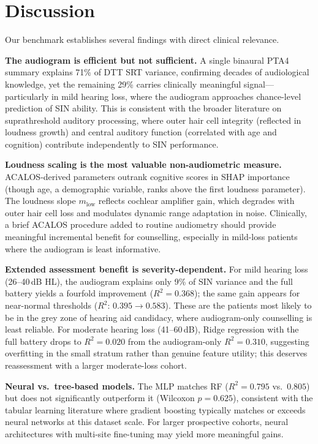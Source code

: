 \documentclass[12pt,a4paper]{article}
\begin{document}
\section{Discussion}

Our benchmark establishes several findings with direct clinical relevance.

\textbf{The audiogram is efficient but not sufficient.}  A single binaural
PTA4 summary explains 71\% of DTT SRT variance, confirming decades of
audiological knowledge\cite{Smoorenburg1992}, yet the remaining 29\%
carries clinically meaningful signal---particularly in mild hearing loss,
where the audiogram approaches chance-level prediction of SIN ability.
This is consistent with the broader literature on suprathreshold auditory
processing, where outer hair cell integrity (reflected in loudness growth)
and central auditory function (correlated with age and cognition) contribute
independently to SIN performance\cite{Moore2001DeadRegions}.

\textbf{Loudness scaling is the most valuable non-audiometric measure.}
ACALOS-derived parameters outrank cognitive scores in SHAP importance (though
age, a demographic variable, ranks above the first loudness parameter).  The
loudness slope $m_\text{low}$ reflects cochlear amplifier gain, which degrades
with outer hair cell loss and modulates dynamic range adaptation in
noise\cite{Brand2002}.  Clinically, a brief ACALOS procedure added
to routine audiometry should provide meaningful incremental benefit for
counselling, especially in mild-loss patients where the audiogram is least
informative.

\textbf{Extended assessment benefit is severity-dependent.}  For mild hearing
loss (26--40\,dB HL), the audiogram explains only 9\% of SIN variance and
the full battery yields a fourfold improvement ($R^2=0.368$); the same gain
appears for near-normal thresholds ($R^2$: $0.395\to0.583$).  These are the
patients most likely to be in the grey zone of hearing aid candidacy, where
audiogram-only counselling is least reliable.  For moderate hearing loss
(41--60\,dB), Ridge regression with the full battery drops to $R^2=0.020$
from the audiogram-only $R^2=0.310$, suggesting overfitting in the small
stratum rather than genuine feature utility; this deserves reassessment with
a larger moderate-loss cohort.

\textbf{Neural vs.\ tree-based models.}  The MLP matches RF ($R^2=0.795$ vs.\
$0.805$) but does not significantly outperform it (Wilcoxon $p=0.625$),
consistent with the tabular learning literature where gradient boosting
typically matches or exceeds neural networks at this dataset
scale\cite{Gorishniy2021Revisiting}.  For larger prospective cohorts, neural
architectures with multi-site fine-tuning may yield more meaningful gains.
\end{document}
